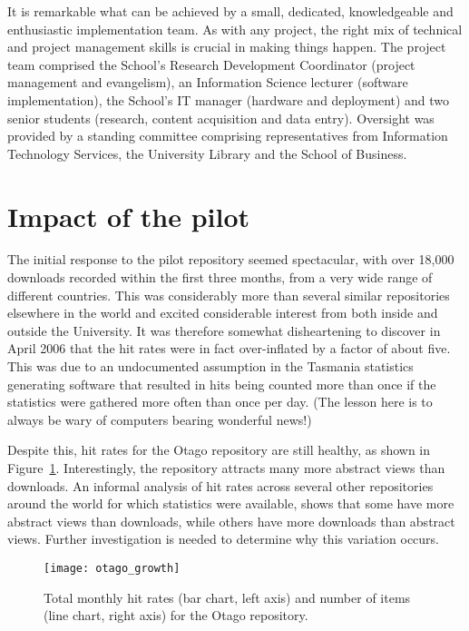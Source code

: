 \documentclass[12pt,pdftex,a4paper,titlepage]{article}
\begin{document}
It is remarkable what can be achieved by a small, dedicated, knowledgeable and enthusiastic implementation team. As with any project, the right mix of technical and project management skills is crucial in making things happen. The project team comprised the School's Research Development Coordinator (project management and evangelism), an Information Science lecturer (software implementation), the School's IT manager (hardware and deployment) and two senior students (research, content acquisition and data entry). Oversight was provided by a standing committee comprising representatives from Information Technology Services, the University Library and the School of Business.


\section{Impact of the pilot}

The initial response to the pilot repository seemed spectacular, with over 18,000 downloads recorded within the first three months, from a very wide range of different countries. This was considerably more than several similar repositories elsewhere in the world and excited considerable interest from both inside and outside the University. It was therefore somewhat disheartening to discover in April 2006 that the hit rates were in fact over-inflated by a factor of about five. This was due to an undocumented assumption in the Tasmania statistics generating software \cite{Sale-A-2006-stats} that resulted in hits being counted more than once if the statistics were gathered more often than once per day. (The lesson here is to always be wary of computers bearing wonderful news!)

Despite this, hit rates for the Otago repository are still healthy, as shown in Figure~\ref{fig-otago-growth}. Interestingly, the repository attracts many more abstract views than downloads. An informal analysis of hit rates across several other repositories around the world for which statistics were available, shows that some have more abstract views than downloads, while others have more downloads than abstract views. Further investigation is needed to determine why this variation occurs.


\begin{figure}
	\centering
	\texttt{[image: otago\_growth]}
	\caption{Total monthly hit rates (bar chart, left axis) and number of items (line chart, right axis) for the Otago repository.}
	\label{fig-otago-growth}
\end{figure}
\end{document}
